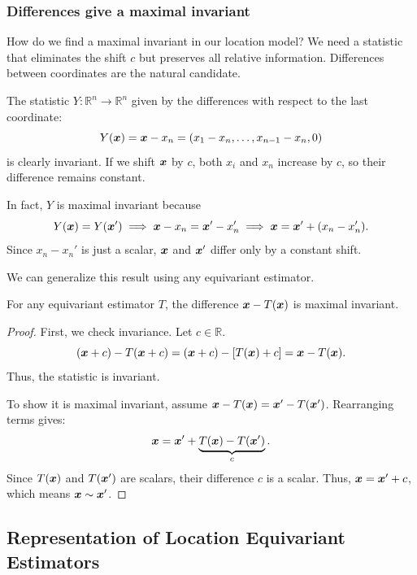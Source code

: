 \subsubsection{Differences give a maximal invariant}
\label{subsec:differences_maximal}

How do we find a maximal invariant in our location model? We need a statistic that eliminates the shift \(c\) but preserves all relative information. Differences between coordinates are the natural candidate.

\begin{ex} \label{ex:diff_invariant}
The statistic \(Y : \mathbb{R}^n \to \mathbb{R}^n\) given by the differences with respect to the last coordinate:
\[Y(\boldsymbol{x}) = \boldsymbol{x} - x_n = (x_1 - x_n, \dots, x_{n-1} - x_n, 0)\]
is clearly invariant. If we shift \(\boldsymbol{x}\) by \(c\), both \(x_i\) and \(x_n\) increase by \(c\), so their difference remains constant.

In fact, \(Y\) is maximal invariant because
\[Y(\boldsymbol{x}) = Y(\boldsymbol{x}') \implies \boldsymbol{x} - x_n = \boldsymbol{x}' - x_n' \implies \boldsymbol{x} = \boldsymbol{x}' + (x_n - x_n').\]
Since \(x_n - x_n'\) is just a scalar, \(\boldsymbol{x}\) and \(\boldsymbol{x}'\) differ only by a constant shift.
\end{ex}

We can generalize this result using any equivariant estimator.

\begin{lemma} \label{lemma:general_diff_invariant}
For any equivariant estimator \(T\), the difference \(\boldsymbol{x} - T(\boldsymbol{x})\) is maximal invariant.
\end{lemma}

\begin{proof}
First, we check invariance. Let \(c \in \mathbb{R}\).
\[ (\boldsymbol{x} + c) - T(\boldsymbol{x} + c) = (\boldsymbol{x} + c) - [T(\boldsymbol{x}) + c] = \boldsymbol{x} - T(\boldsymbol{x}). \]
Thus, the statistic is invariant. 

To show it is maximal invariant, assume \(\boldsymbol{x} - T(\boldsymbol{x}) = \boldsymbol{x}' - T(\boldsymbol{x}')\). Rearranging terms gives:
\[ \boldsymbol{x} = \boldsymbol{x}' + \underbrace{T(\boldsymbol{x}) - T(\boldsymbol{x}')}_{c}. \]
Since \(T(\boldsymbol{x})\) and \(T(\boldsymbol{x}')\) are scalars, their difference \(c\) is a scalar. Thus, \(\boldsymbol{x} = \boldsymbol{x}' + c\), which means \(\boldsymbol{x} \sim \boldsymbol{x}'\).
\end{proof}

\subsection{Representation of Location Equivariant Estimators}
\label{subsec:rep_loc_equi}

